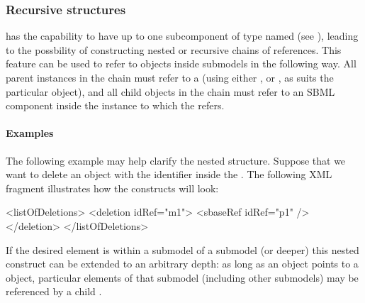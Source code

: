 \subsubsection{Recursive  structures}
\label{sbaseref-recursive-sbaseref}


\SBaseRef has the capability to have up to one subcomponent of type
\SBaseRef named  (see ), leading to
the possbility of constructing nested or recursive chains of references.
This feature can be used to refer to objects inside submodels in the
following way.  All parent \SBaseRef instances in the chain must refer to
a \Submodel (using either
,  or , as suits the
particular object), and all child \SBaseRef objects in the chain must refer to an SBML component inside the \Model
instance to which the \Submodel refers.


\paragraph{Examples}

The following example may help clarify the nested structure.  Suppose
that we want to delete an object with the identifier  inside the
\Submodel {}.  The following XML fragment illustrates how the
constructs will look:

\begin{example}
<listOfDeletions>
  <deletion idRef="m1">
    <sbaseRef idRef="p1" />
  </deletion>
</listOfDeletions>
\end{example}

If the desired element is within a submodel of a submodel (or deeper)
this nested construct can be extended to an arbitrary depth: as long as
an \SBaseRef object points to a \Submodel object, particular elements of
that submodel (including other submodels) may be referenced by a child
\SBaseRef.


